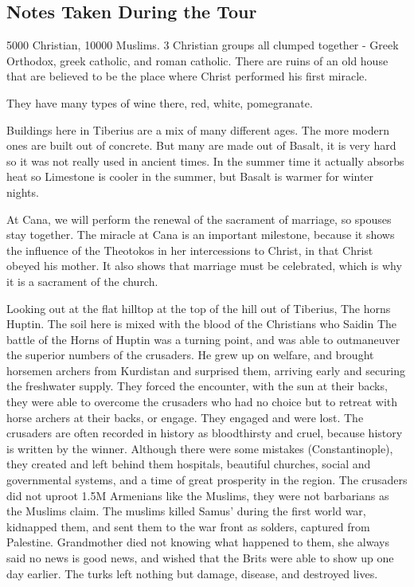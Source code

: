 \documentclass[letterpaper]{report}
\begin{document}
\subsection{Notes Taken During the Tour}
5000 Christian, 10000 Muslims.
3 Christian groups all clumped together - Greek Orthodox, greek catholic, and roman catholic.
There are ruins of an old house that are believed to be the place where Christ performed his first miracle.

They have many types of wine there, red, white, pomegranate.

Buildings here in Tiberius are a mix of many different ages. The more modern ones are built out of concrete.
 But many are made out of Basalt, it is very hard so it was not really used in ancient times. In the summer time it actually absorbs heat so Limestone is cooler in the summer, but Basalt is warmer for winter nights.

At Cana, we will perform the renewal of the sacrament of marriage, so spouses stay together.
The miracle at Cana is an important milestone, because it shows the influence of the Theotokos in her intercessions to Christ, in that Christ obeyed his mother. It also shows that marriage must be celebrated, which is why it is a sacrament of the church.

 Looking out at the flat hilltop at the top of the hill out of Tiberius, The horns Huptin. The soil here is mixed with the blood of the Christians who Saidin 
The battle of the Horns of Huptin was a turning point, and was able to outmaneuver the superior numbers of the crusaders.  He grew up on welfare, and brought horsemen archers from Kurdistan and surprised them, arriving early and securing the freshwater supply. They forced the encounter, with the sun at their backs, they were able to overcome the crusaders who had no choice but to retreat with horse archers at their backs, or engage. They engaged and were lost.
The crusaders are often recorded in history as bloodthirsty and cruel, because history is written by the winner. Although there were some mistakes (Constantinople), they created and left behind them hospitals, beautiful churches, social and governmental systems, and a time of great prosperity in the region.
The crusaders did not uproot 1.5M Armenians like the Muslims, they were not barbarians as the Muslims claim. The muslims killed Samus' during the first world war, kidnapped them, and sent them to the war front as solders, captured from Palestine. Grandmother died not knowing what happened to them, she always said no news is good news, and wished that the Brits were able to show up one day earlier. The turks left nothing but damage, disease, and destroyed lives. 
\end{document}
